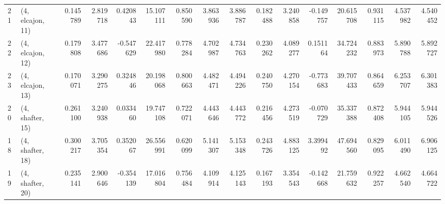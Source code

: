 \begin{tabular}{llrrrrrrrrrrrrrr}
21 &  (4, elcajon, 11) &   0.145789 &  2.819718 &  0.420843 &   15.107111 &  0.850590 &   3.863936 &   3.886787 &  0.182488 &  3.240858 & -0.149757 &   20.615708 &  0.931115 &   4.537982 &   4.540452 \\
22 &  (4, elcajon, 12) &   0.179808 &  3.477686 & -0.547629 &   22.417980 &  0.778284 &   4.702987 &   4.734763 &  0.230262 &  4.089277 &  0.151164 &   34.724232 &  0.883973 &   5.890788 &   5.892727 \\
23 &  (4, elcajon, 13) &   0.170071 &  3.290275 &  0.324846 &   20.198068 &  0.800663 &   4.482471 &   4.494226 &  0.240750 &  4.270154 & -0.773683 &   39.707433 &  0.864659 &   6.253707 &   6.301383 \\
20 &  (4, shafter, 15) &   0.261100 &  3.240938 &  0.033460 &   19.747108 &  0.722071 &   4.443646 &   4.443772 &  0.216456 &  4.273519 & -0.070729 &   35.337388 &  0.872408 &   5.944105 &   5.944526 \\
18 &  (4, shafter, 18) &   0.300217 &  3.705354 &  0.352067 &   26.556991 &  0.620099 &   5.141307 &   5.153348 &  0.243726 &  4.883125 &  3.399492 &   47.694560 &  0.829095 &   6.011490 &   6.906125 \\
19 &  (4, shafter, 20) &   0.235141 &  2.900646 & -0.354139 &   17.016804 &  0.756484 &   4.109914 &   4.125143 &  0.167193 &  3.354543 & -0.142668 &   21.759632 &  0.922257 &   4.662540 &   4.664722 \\
\bottomrule
\end{tabular}
